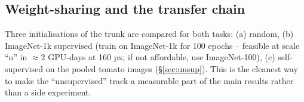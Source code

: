 \subsection{Weight-sharing and the transfer chain}
\label{sec:transfer_chain}
\begin{center}
\end{center}
Three initialisations of the trunk are compared for both tasks: (a) random, (b) ImageNet-1k supervised (train \modelcls{} on ImageNet-1k for 100 epochs -- feasible at scale ``n'' in $\approx$2 GPU-days at 160 px; if not affordable, use ImageNet-100), (c) self-supervised on the pooled tomato images (\S\ref{sec:unsup}). This is the cleanest way to make the ``unsupervised'' track a measurable part of the main results rather than a side experiment.

